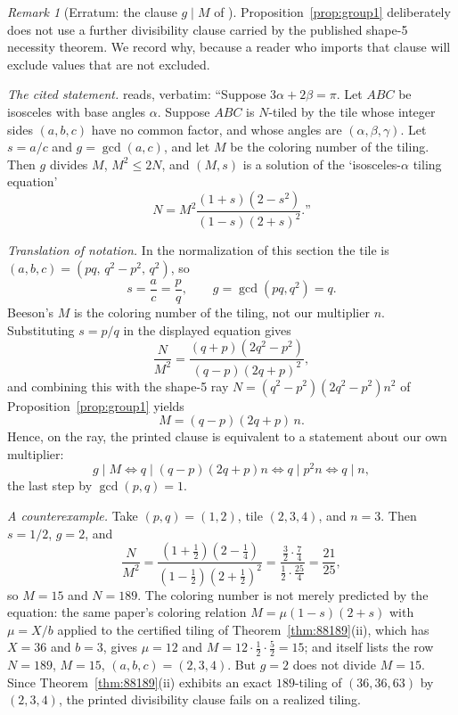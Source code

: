 \documentclass[11pt]{amsart}
\theoremstyle{definition}
\theoremstyle{remark}
\newtheorem{remark}[theorem]{Remark}
\begin{document}
\begin{remark}[Erratum: the clause $g\mid M$ of {\cite[Thm.~19]{Beeson2229}}]
\label{rem:gM}
Proposition~\ref{prop:group1} deliberately does not use a further
divisibility clause carried by the published shape-5 necessity theorem.  We
record why, because a reader who imports that clause will exclude values
that are not excluded.

\emph{The cited statement.}  \cite[Thm.~19]{Beeson2229} reads, verbatim:
``Suppose $3\alpha+2\beta=\pi$.  Let $ABC$ be isosceles with base angles
$\alpha$.  Suppose $ABC$ is $N$-tiled by the tile whose integer sides
$(a,b,c)$ have no common factor, and whose angles are
$(\alpha,\beta,\gamma)$.  Let $s=a/c$ and $g=\gcd(a,c)$, and let $M$ be the
coloring number of the tiling.  Then $g$ divides $M$, $M^2\le2N$, and
$(M,s)$ is a solution of the `isosceles-$\alpha$ tiling equation'
\[
   N=M^2\frac{(1+s)(2-s^2)}{(1-s)(2+s)^2}\text{.''}
\]

\emph{Translation of notation.}  In the normalization of this section the
tile is $(a,b,c)=(pq,\,q^2-p^2,\,q^2)$, so
\[
   s=\frac ac=\frac pq,\qquad g=\gcd(pq,q^2)=q .
\]
Beeson's $M$ is the coloring number of the tiling, not our multiplier $n$.
Substituting $s=p/q$ in the displayed equation gives
\[
   \frac{N}{M^2}=\frac{(q+p)(2q^2-p^2)}{(q-p)(2q+p)^2},
\]
and combining this with the shape-5 ray $N=(q^2-p^2)(2q^2-p^2)n^2$ of
Proposition~\ref{prop:group1} yields
\[
   M=(q-p)(2q+p)\,n .
\]
Hence, on the ray, the printed clause is equivalent to a statement about our
own multiplier:
\[
  g\mid M
  \iff q\mid(q-p)(2q+p)n
  \iff q\mid p^2n
  \iff q\mid n ,
\]
the last step by $\gcd(p,q)=1$.

\emph{A counterexample.}  Take $(p,q)=(1,2)$, tile $(2,3,4)$, and $n=3$.
Then $s=1/2$, $g=2$, and
\[
   \frac{N}{M^2}
   =\frac{(1+\tfrac12)(2-\tfrac14)}{(1-\tfrac12)(2+\tfrac12)^2}
   =\frac{\tfrac32\cdot\tfrac74}{\tfrac12\cdot\tfrac{25}4}
   =\frac{21}{25},
\]
so $M=15$ and $N=189$.  The coloring number is not merely predicted by the
equation: the same paper's coloring relation $M=\mu(1-s)(2+s)$ with
$\mu=X/b$ applied to the certified tiling of Theorem~\ref{thm:88189}(ii),
which has $X=36$ and $b=3$, gives $\mu=12$ and
$M=12\cdot\tfrac12\cdot\tfrac52=15$; and \cite[Table~5]{Beeson2229} itself
lists the row $N=189$, $M=15$, $(a,b,c)=(2,3,4)$.  But $g=2$ does not divide
$M=15$.  Since Theorem~\ref{thm:88189}(ii) exhibits an exact $189$-tiling of
$(36,36,63)$ by $(2,3,4)$, the printed divisibility clause fails on a
realized tiling.


\end{remark}
\end{document}
